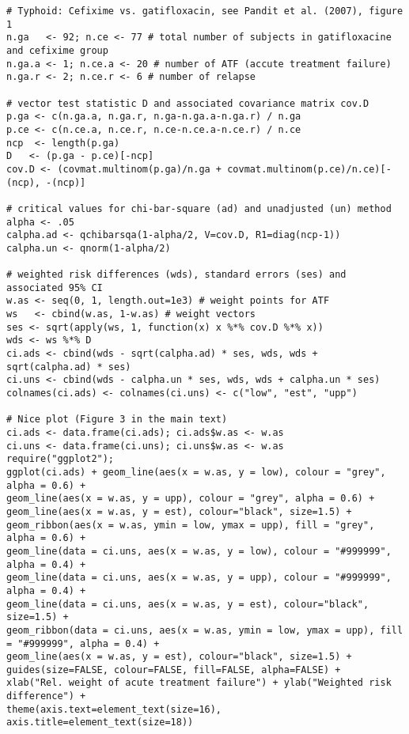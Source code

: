 \documentclass[times,doublespace]{simauth_amod}
\begin{document}
\begin{lstlisting}
# Typhoid: Cefixime vs. gatifloxacin, see Pandit et al. (2007), figure 1
n.ga   <- 92; n.ce <- 77 # total number of subjects in gatifloxacine and cefixime group
n.ga.a <- 1; n.ce.a <- 20 # number of ATF (accute treatment failure)
n.ga.r <- 2; n.ce.r <- 6 # number of relapse 

# vector test statistic D and associated covariance matrix cov.D
p.ga <- c(n.ga.a, n.ga.r, n.ga-n.ga.a-n.ga.r) / n.ga
p.ce <- c(n.ce.a, n.ce.r, n.ce-n.ce.a-n.ce.r) / n.ce
ncp  <- length(p.ga)
D   <- (p.ga - p.ce)[-ncp] 
cov.D <- (covmat.multinom(p.ga)/n.ga + covmat.multinom(p.ce)/n.ce)[-(ncp), -(ncp)] 

# critical values for chi-bar-square (ad) and unadjusted (un) method
alpha <- .05 
calpha.ad <- qchibarsqa(1-alpha/2, V=cov.D, R1=diag(ncp-1)) 
calpha.un <- qnorm(1-alpha/2)

# weighted risk differences (wds), standard errors (ses) and associated 95% CI 
w.as <- seq(0, 1, length.out=1e3) # weight points for ATF
ws   <- cbind(w.as, 1-w.as) # weight vectors
ses <- sqrt(apply(ws, 1, function(x) x %*% cov.D %*% x))
wds <- ws %*% D
ci.ads <- cbind(wds - sqrt(calpha.ad) * ses, wds, wds + sqrt(calpha.ad) * ses)
ci.uns <- cbind(wds - calpha.un * ses, wds, wds + calpha.un * ses)
colnames(ci.ads) <- colnames(ci.uns) <- c("low", "est", "upp")

# Nice plot (Figure 3 in the main text)
ci.ads <- data.frame(ci.ads); ci.ads$w.as <- w.as
ci.uns <- data.frame(ci.uns); ci.uns$w.as <- w.as
require("ggplot2"); 
ggplot(ci.ads) + geom_line(aes(x = w.as, y = low), colour = "grey", alpha = 0.6) + 
geom_line(aes(x = w.as, y = upp), colour = "grey", alpha = 0.6) + 
geom_line(aes(x = w.as, y = est), colour="black", size=1.5) + 
geom_ribbon(aes(x = w.as, ymin = low, ymax = upp), fill = "grey", alpha = 0.6) + 
geom_line(data = ci.uns, aes(x = w.as, y = low), colour = "#999999", alpha = 0.4) + 
geom_line(data = ci.uns, aes(x = w.as, y = upp), colour = "#999999", alpha = 0.4) + 
geom_line(data = ci.uns, aes(x = w.as, y = est), colour="black", size=1.5) + 
geom_ribbon(data = ci.uns, aes(x = w.as, ymin = low, ymax = upp), fill = "#999999", alpha = 0.4) + 
geom_line(aes(x = w.as, y = est), colour="black", size=1.5) + 
guides(size=FALSE, colour=FALSE, fill=FALSE, alpha=FALSE) + 
xlab("Rel. weight of acute treatment failure") + ylab("Weighted risk difference") + 
theme(axis.text=element_text(size=16), axis.title=element_text(size=18))
\end{lstlisting}
\clearpage



\end{document}

